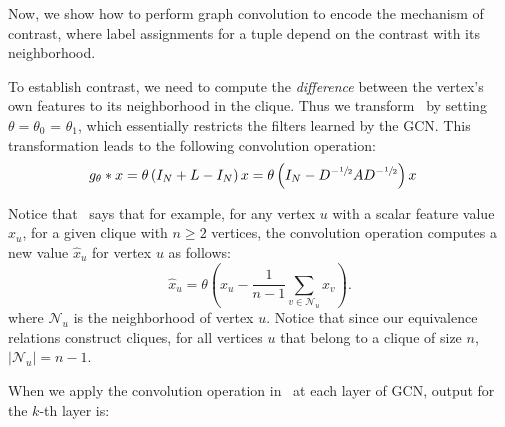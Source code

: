 Now, we show how to perform graph convolution to encode the mechanism of contrast, where label assignments for a tuple depend on the contrast with its neighborhood.

To establish contrast, we need to compute the \emph{difference} between the vertex's own features to its neighborhood in the clique. Thus we transform~ by setting $\theta = \theta_{0}$ = $\theta_{1}$, which essentially restricts the filters learned by the GCN. This transformation leads to the following convolution operation:
\begin{align}
g_{\theta} * x & =  \theta \left( I_N + L- I_{N} \right) x =  \theta \left( I_N - D^{-\sfrac{1}{2}} A D^{-\sfrac{1}{2}}\right) x \label{eq:contrastdetail}
\end{align}

Notice that~ says that for example, for any vertex $u$ with a scalar feature value $x_u$, for a given clique with $n \geq 2$ vertices, the convolution operation computes a new value $\hat{x}_u$ for vertex $u$ as follows:
\begin{equation}
  \hat{x}_u = \theta \left ( x_u - \frac{1}{n-1} \sum_{v \in \mathcal{N}_u} x_v \right ).
\end{equation}
where $\mathcal{N}_u$ is the neighborhood of vertex $u$. Notice that since our equivalence relations construct cliques, for all vertices $u$ that belong to a clique of size $n$, $|\mathcal{N}_u| = n-1$.

When we apply the convolution operation in~ at each layer of GCN, output for the $k$-th layer is:


